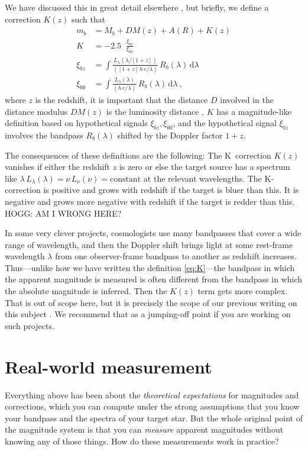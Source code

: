 \documentclass[10pt]{article}
\newcommand{\dd}{\mathrm{d}}
\DeclareMathOperator{\logten}{log_{10}}
\begin{document}
We have discussed this in great detail elsewhere \cite{kcorrect}, but briefly, we define a correction $K(z)$ such that
\begin{align}
    m_b &= M_b + DM(z) + A(R) + K(z)\label{eq:K}\\
    K &= -2.5\logten\frac{\xi_{bz}}{\xi_{b0}}\\
    \xi_{bz} &= \int\frac{L_\lambda(\lambda/[1+z])}{([1+z]\,h\,c/\lambda)}\,R_b(\lambda)\,\dd\lambda\\
    \xi_{b0} &= \int\frac{L_\lambda(\lambda)}{(h\,c/\lambda)}\,R_b(\lambda)\,\dd\lambda ~,
\end{align}
where $z$ is the redshift,
it is important that the distance $D$ involved in the distance modulus $DM(z)$ is the luminosity distance \cite{distances},
$K$ has a magnitude-like definition based on hypothetical signals $\xi_{bz}, \xi_{b0}$,
and the hypothetical signal $\xi_{bz}$ involves the bandpass $R_b(\lambda)$ shifted by the Doppler factor $1+z$.

The consequences of these definitions are the following:
The K~correction $K(z)$ vanishes if either the redshift $z$ is zero or else the target source has a spectrum like $\lambda\,L_\lambda(\lambda)=\nu\,L_\nu(\nu)=\text{constant}$ at the relevant wavelengths.
The K-correction is positive and grows with redshift if the target is bluer than this.
It is negative and grows more negative with redshift if the target is redder than this.
HOGG: AM I WRONG HERE?

In some very clever projects, cosmologists use many bandpasses that cover a wide range of wavelength, and then the Doppler shift brings light at some rest-frame wavelength $\lambda$ from one observer-frame bandpass to another as redshift increases.
Thus---unlike how we have written the definition \eqref{eq:K}---the bandpass in which the apparent magnitude is measured is often different from the bandpass in which the absolute magnitude is inferred. Then the $K(z)$ term gets more complex.
That is out of scope here, but it is precisely the scope of our previous writing on this subject \cite{kcorrect}.
We recommend that as a jumping-off point if you are working on such projects.

\section{Real-world measurement}\label{sec:practice}

Everything above has been about the \emph{theoretical expectations} for magnitudes and corrections, which you can compute under the strong assumptions that you know your bandpass and the spectra of your target star.
But the whole original point of the magnitude system is that you can \emph{measure} apparent magnitudes without knowing any of those things.
How do these measurements work in practice?
\end{document}
